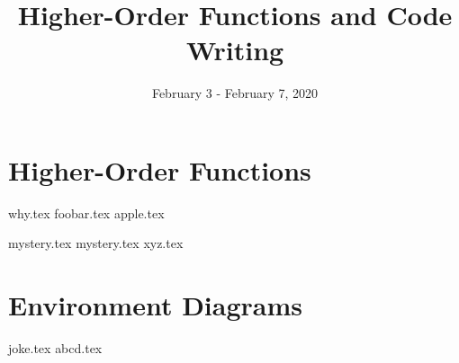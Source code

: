 \documentclass{exam}
\title{Higher-Order Functions and Code Writing}
\date{February 3 - February 7, 2020}
\begin{document}
\maketitle

\section{Higher-Order Functions}
\begin{questions}
{why.tex}
{foobar.tex}
{apple.tex}
\clearpage

{mystery.tex}
{mystery.tex}
\clearpage
{xyz.tex}

\section{Environment Diagrams}
{joke.tex}
{abcd.tex}

\end{questions}
\end{document}
